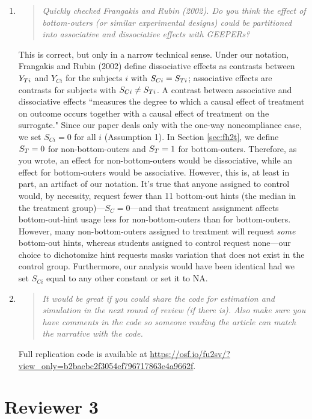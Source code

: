 \documentclass[]{article}
\newenvironment{itquote}
  {\begin{quote} \itshape}
  {\end{quote}\ignorespacesafterend}
\begin{document}
\begin{enumerate}
\item \begin{itquote}     Quickly checked Frangakis and Rubin (2002). Do you think the effect of bottom-outers (or similar experimental designs) could be partitioned into associative and dissociative effects with GEEPERs?
\end{itquote}
This is correct, but only in a narrow technical sense. 
Under our notation, Frangakis and Rubin (2002) define dissociative effects as contrasts between $Y_{Ti}$ and $Y_{Ci}$ for the subjects $i$ with $S_{Ci}=S_{Ti}$; associative effects are contrasts for subjects with $S_{Ci}\ne S_{Ti}$. A contrast between associative and dissociative effects ``measures the degree to which a causal effect of treatment on outcome occurs together with a causal effect of treatment on the surrogate."  Since our paper deals only with the one-way noncompliance case, we set $S_{Ci}=0$ for all $i$ (Assumption 1). In Section \ref{sec:fh2t}, we define $S_T=0$ for non-bottom-outers and $S_T=1$ for bottom-outers. Therefore, as you wrote, an effect for non-bottom-outers would be dissociative, while an effect for bottom-outers would be associative. However, this is, at least in part, an artifact of our notation. It's true that anyone assigned to control would, by necessity, request fewer than 11 bottom-out hints (the median in the treatment group)---$S_C=0$---and that treatment assignment affects bottom-out-hint usage less for non-bottom-outers than for bottom-outers. However, many non-bottom-outers assigned to treatment will request \emph{some} bottom-out hints, whereas students assigned to control request none---our choice to dichotomize hint requests masks variation that does not exist in the control group. Furthermore, our analysis would have been identical had we set $S_{Ci}$ equal to any other constant or set it to NA. 

\item \begin{itquote}    It would be great if you could share the code for estimation and simulation in the next round of review (if there is). Also make sure you have comments in the code so someone reading the article can match the narrative with the code.
\end{itquote}
\sloppy
Full replication code is available at \url{https://osf.io/fu2sv/?view_only=b2baebc2f3054ef796717863e4a9662f}. 
\end{enumerate}

\section{Reviewer 3}
\end{document}
